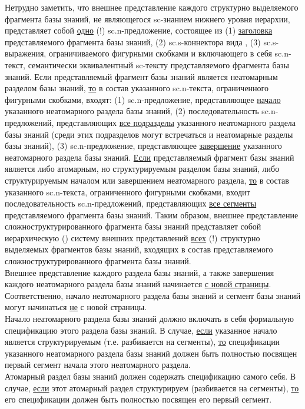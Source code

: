 \begin{SCn}
{Нетрудно заметить, что внешнее представление каждого структурно выделяемого фрагмента базы знаний, не являющегося sc-знанием нижнего уровня иерархии, представляет собой \uline{одно} (!) sc.n-предложение, состоящее из (1) \uline{заголовка} представляемого фрагмента базы знаний, (2) sc.s-коннектора вида \scnqqi{$\supset$=}, (3) sc.s-выражения, ограничиваемого фигурными скобками и включающего в себя sc.n-текст, семантически эквивалентный sc-тексту представляемого фрагмента базы знаний. Если представляемый фрагмент базы знаний является неатомарным разделом базы знаний, \uline{то} в состав указанного sc.n-текста, ограниченного фигурными скобками, входят: (1) sc.n-предложение, представляющее \uline{начало} указанного неатомарного раздела базы знаний, (2) последовательность sc.n-предложений, представляющих \uline{все подразделы} указанного неатомарного раздела базы знаний (среди этих подразделов могут встречаться и неатомарные разделы базы знаний), (3) sc.n-предложение, представляющее \uline{завершение} указанного неатомарного раздела базы знаний. \uline{Если} представляемый фрагмент базы знаний является либо атомарным, но структурируемым разделом базы знаний, либо структурируемым началом или завершением неатомарного раздела, \uline{то} в состав указанного sc.n-текста, ограниченного фигурными скобками, входит последовательность sc.n-предложений, представляющих \uline{все сегменты} представляемого фрагмента базы знаний. Таким образом, внешнее представление сложноструктурированного фрагмента базы знаний представляет собой иерархическую () систему внешних представлений \uline{всех} (!) структурно выделяемых фрагментов базы знаний, входящих в состав представляемого сложноструктурированного фрагмента базы знаний.\\
Внешнее представление каждого раздела базы знаний, а также завершения каждого неатомарного раздела базы знаний начинается \uline{с новой страницы}. Соответственно, начало неатомарного раздела базы знаний и сегмент базы знаний могут начинаться \uline{не} с новой страницы.\\
Начало неатомарного раздела базы знаний должно включать в себя формальную спецификацию этого раздела базы знаний. В случае, \uline{если} указанное начало является структурируемым (т.е. разбивается на сегменты), \uline{то} спецификации указанного неатомарного раздела базы знаний должен быть полностью посвящен первый сегмент начала этого неатомарного раздела.\\
Атомарный раздел базы знаний должен содержать спецификацию самого себя. В случае, \uline{если} этот атомарный раздел структурируем (разбивается на сегменты), \uline{то} его спецификации должен быть полностью посвящен его первый сегмент.\\
}
\end{SCn}
